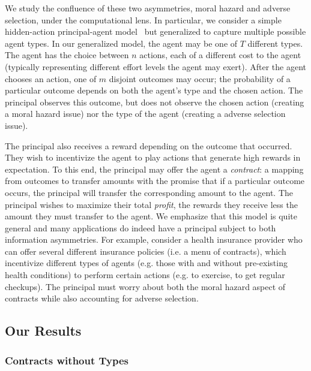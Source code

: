 \documentclass{article}
\newcommand{\joshnote}[1]{}
\newcommand{\ggnote}[1]{}
\begin{document}
We study the confluence of these two asymmetries, moral hazard and adverse selection, under the computational lens. In particular, we consider a simple hidden-action principal-agent model~\cite{grossman1992analysis} but generalized to capture multiple possible agent types. In our generalized model, the agent may be one of $T$ different types. The agent has the choice between $n$ actions, each of a different cost to the agent (typically representing different effort levels the agent may exert). After the agent chooses an action, one of $m$ disjoint outcomes may occur; the probability of a particular outcome depends on both the agent's type and the chosen action. The principal observes this outcome, but does not observe the chosen action (creating a moral hazard issue) nor the type of the agent (creating a adverse selection issue).

The principal also receives a reward depending on the outcome that occurred. They wish to incentivize the agent to play actions that generate high rewards in expectation. To this end, the principal may offer the agent a \emph{contract}: a mapping from outcomes to transfer amounts with the promise that if a particular outcome occurs, the principal will transfer the corresponding amount to the agent. The principal wishes to maximize their total \emph{profit}, the rewards they receive less the amount they must transfer to the agent. We emphasize that this model is quite general and many applications do indeed have a principal subject to both information asymmetries. For example, consider a health insurance provider who can offer several different insurance policies (i.e. a menu of contracts), which incentivize different types of agents (e.g. those with and without pre-existing health conditions) to perform certain actions (e.g. to exercise, to get regular checkups). The principal must worry about both the moral hazard aspect of contracts while also accounting for adverse selection.


\subsection{Our Results}
\subsubsection*{Contracts without Types}
\end{document}
